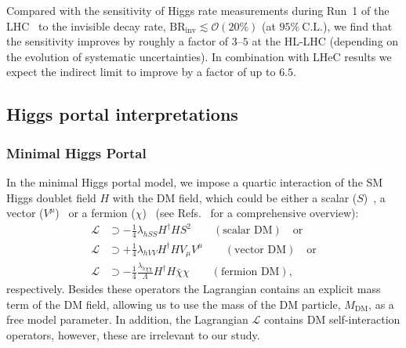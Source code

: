 \documentclass[../report.tex]{subfiles}
\newcommand{\BRHinv}{\mathrm{BR}_\mathrm{inv}}
\begin{document}
{Compared with the sensitivity of Higgs rate measurements during Run~1 of the LHC~\cite{Khachatryan:2016vau} to the invisible decay rate, $\BRHinv \lesssim \mathcal{O}({20\%})$} (at $95\%~\mathrm{C.L.}$), we find that the sensitivity improves by roughly a factor of $3$--$5$  at the HL-LHC (depending on the evolution of systematic uncertainties). In combination with LHeC results we expect the indirect limit to improve by a factor of up to {$6.5$}.



\subsection{Higgs portal interpretations}

\subsubsection{Minimal Higgs Portal}
\label{sec6:minimalHP}

In the minimal Higgs portal model, we impose a quartic interaction of the SM Higgs doublet field $H$ with the DM field, which could be either a scalar ($S$)~\cite{Silveira:1985rk}, a vector ($V^\mu$)~\cite{Lebedev:2011iq} or a fermion ($\chi$)~\cite{Kim:2006af} (see Refs.~\cite{Kanemura:2010sh,Djouadi:2011aa} for a comprehensive overview):
\begin{align}
\mathcal{L} &\supset -\tfrac{1}{4} \lambda_{hSS} H^\dagger H S^2 \qquad (\mbox{scalar~DM}) \quad \mbox{or} \label{eq:scalarDM}\\
\mathcal{L} &\supset +\tfrac{1}{4}  \lambda_{hVV} H^\dagger H V_\mu V^\mu \qquad (\mbox{vector~DM}) \quad \mbox{or} \label{eq:vectorDM}\\
\mathcal{L} &\supset -\tfrac{1}{4}  \tfrac{\lambda_{h\chi\chi}}{\Lambda} H^\dagger H \bar{\chi} \chi \qquad (\mbox{fermion~DM}), \label{eq:fermionDM}
\end{align}
respectively. Besides these operators the Lagrangian contains an explicit mass term of the DM field, allowing us to use the mass of the DM particle, $M_\text{DM}$, as a free model parameter. In addition, the Lagrangian $\mathcal{L}$ contains DM self-interaction operators, however, these are irrelevant to our study.
\end{document}

